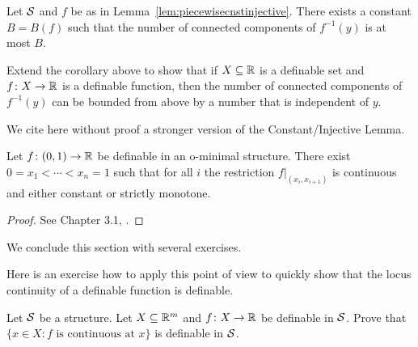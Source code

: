 \begin{corollary}
  Let ${\mathcal S}$ and  $f$ be as in Lemma~\ref{lem:piecewisecnstinjective}.
  There exists a constant $B=B(f)$ such that the number of connected
  components of $f^{-1}(y)$ is at most $B$. 
\end{corollary}

\begin{exercise}
  Extend the corollary above to show that if $X\subseteq{\mathbb{R}}$ is a
  definable set and $f\colon X\rightarrow{\mathbb{R}}$ is a definable function,
  then the number of connected components of $f^{-1}(y)$ can be bounded
  from above by a number that is independent of $y$.  
\end{exercise}


We cite here without proof a stronger version of the
Constant/Injective Lemma.

\begin{theorem}
  \label{thm:monotone}
  Let $f\colon (0,1)\rightarrow{\mathbb{R}}$ be definable in an o-minimal
  structure. There exist $0=x_1<\cdots <x_n =1$
  such that for all $i$ the restriction  $f|_{(x_i,x_{i+1})}$
  is continuous and either constant or strictly monotone.
\end{theorem}
\begin{proof}
  See Chapter 3.1, \cite{D:oMin}. 
\end{proof}

We conclude this section with several exercises.

Here is an exercise how to apply this point of view to quickly show
that the locus continuity of a definable function is definable.

\begin{exercise}
  Let ${\mathcal S}$ be a structure. 
  Let $X\subseteq{\mathbb{R}}^m$  and $f\colon X\rightarrow{\mathbb{R}}$ be definable in ${\mathcal S}$.
  Prove that $\{ x \in X : f \text{ is continuous at }x\}$ is
  definable in ${\mathcal S}$.
\end{exercise}

